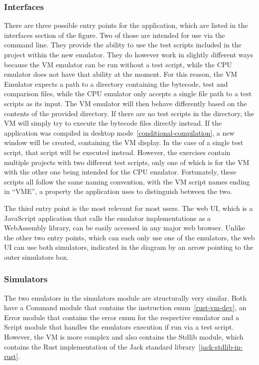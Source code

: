 \subsubsection{Interfaces}
There are three possible entry points for the application, which are listed in the interfaces section of the figure. Two of those are intended for use via the command line. They provide the ability to use the test scripts included in the project within the new emulator.
They do however work in slightly different ways because the VM emulator can be run without a test script, while the CPU emulator does not have that ability at the moment.
For this reason, the VM Emulator expects a path to a directory containing the bytecode, test and comparison files, while the CPU emulator only accepts a single file path to a test scripts as its input.
The VM emulator will then behave differently based on the contents of the provided directory.
If there are no test scripts in the directory, the VM will simply try to execute the bytecode files directly instead. If the application was compiled in desktop mode~\ref{conditional-compilation}, a new window will be created, containing the VM display.
In the case of a single test script, that script will be executed instead. However, the exercises contain multiple projects with two different test scripts, only one of which is for the VM with the other one being intended for the CPU emulator.
Fortunately, these scripts all follow the same naming convention, with the VM script names ending in ``VME'', a property the application uses to distinguish between the two.

The third entry point is the most relevant for most users. The web UI, which is a JavaScript application that calls the emulator implementations as a WebAssembly library, can be easily accessed in any major web browser.
Unlike the other two entry points, which can each only use one of the emulators, the web UI can use both simulators, indicated in the diagram by an arrow pointing to the outer simulators box.

\subsubsection{Simulators}
The two emulators in the simulators module are structurally very similar. Both have a Command module that contains the instruction enum~\ref{rust-vm-dev}, an Error module that contains the error enum for the respective emulator and a Script module that handles the emulators execution if run via a test script.
However, the VM is more complex and also contains the Stdlib module, which contains the Rust implementation of the Jack standard library~\ref{jack-stdlib-in-rust}.

